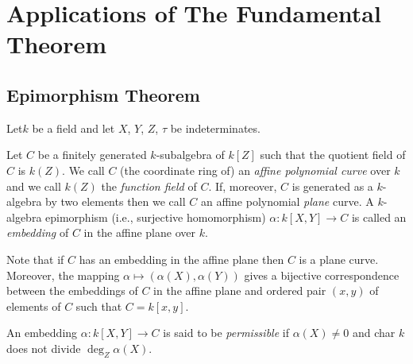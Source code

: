 
\chapter{Applications of The Fundamental Theorem}\label{part1:chap4}

\setcounter{section}{8}
\section{Epimorphism Theorem}\label{part1:chap4:sec9}

Let\pageoriginale $k$ be a field and let $X$, $Y$, $Z$, $\tau$ be indeterminates. 

\begin{defi}\label{part1:chap4:sec9:def9.1}
 Let $C$ be a finitely generated $k$-subalgebra of $k[Z]$ such that the quotient field of $C$ is $k(Z)$. We call $C$ (the coordinate ring of) an {\em affine polynomial curve} over $k$ and we call $k(Z)$ the {\em function field} of $C$. If, moreover, $C$ is generated as a $k$-algebra by two elements then we call $C$ an affine polynomial {\em plane} curve. A $k$-algebra epimorphism (i.e., surjective homomorphism) $\alpha: k[X, Y] \to C$ is called an {\em embedding} of $C$ in the affine plane over $k$.
\end{defi}

Note that if $C$ has an embedding in the affine plane then $C$ is a plane curve. Moreover, the mapping $\alpha \mapsto (\alpha (X), \alpha(Y))$  gives a bijective correspondence between the embeddings of $C$ in the affine plane and ordered pair $(x, y)$ of elements of $C$ such that $C= k[x, y]$.

\begin{defi}\label{part1:chap4:sec9:def9.2}
  An embedding $\alpha: k[X, Y] \to C$ is said to be {\em permissible} if $\alpha (X) \neq 0$ and char $k$ does not divide $\deg_Z \alpha (X)$.
\end{defi}

\setcounter{subsection}{2}

